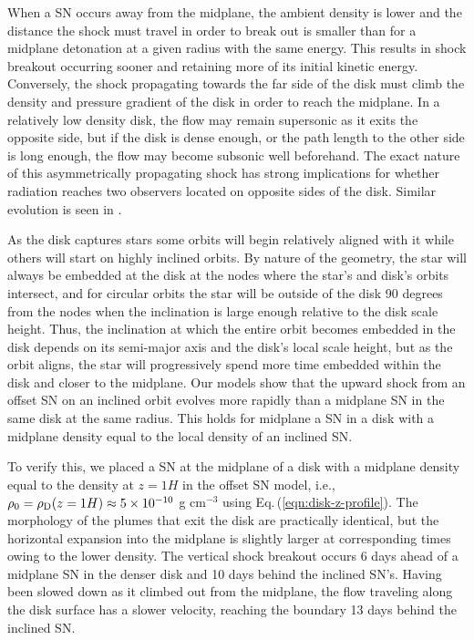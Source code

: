 When a SN occurs away from the midplane, the ambient density is lower and the distance the shock must travel in order to break out is smaller than for a midplane detonation at a given radius with the same energy.
This results in shock breakout occurring sooner and retaining more of its initial kinetic energy.
Conversely, the shock propagating towards the far side of the disk must climb the density and pressure gradient of the disk in order to reach the midplane.
In a relatively low density disk, the flow may remain supersonic as it exits the opposite side, but if the disk is dense enough, or the path length to the other side is long enough, the flow may become subsonic well beforehand.
The exact nature of this asymmetrically propagating shock has strong implications for whether radiation reaches two observers located on opposite sides of the disk.
Similar evolution is seen in \citet{Grishin+21}.

As the disk captures stars \citep{MacLeodLin20,Nasim+22} some orbits will begin relatively aligned with it while others will start on highly inclined orbits.
By nature of the geometry, the star will always be embedded at the disk at the nodes where the star's and disk's orbits intersect, and for circular orbits the star will be outside of the disk 90 degrees from the nodes when the inclination is large enough relative to the disk scale height.
Thus, the inclination at which the entire orbit becomes embedded in the disk depends on its semi-major axis and the disk's local scale height, but as the orbit aligns, the star will progressively spend more time embedded within the disk and closer to the midplane.
Our models show that the upward shock from an offset SN on an inclined orbit evolves more rapidly than a midplane SN in the same disk at the same radius.
This holds for midplane a SN in a disk with a midplane density equal to the local density of an inclined SN.

To verify this, we placed a SN at the midplane of a disk with a midplane density equal to the density at $z=1H$ in the offset SN model, i.e., $\rho_0=\rho_{\rm D}(z=1H)\approx5\times10^{-10}$ g cm$^{-3}$ using Eq.\,(\ref{eqn:disk-z-profile}).
The morphology of the plumes that exit the disk are practically identical, but the horizontal expansion into the midplane is slightly larger at corresponding times owing to the lower density.
The vertical shock breakout occurs 6 days ahead of a midplane SN in the denser disk and 10 days behind the inclined SN's. Having been slowed down as it climbed out from the midplane, the flow traveling along the disk surface has a slower velocity, reaching the boundary 13 days behind the inclined SN.

